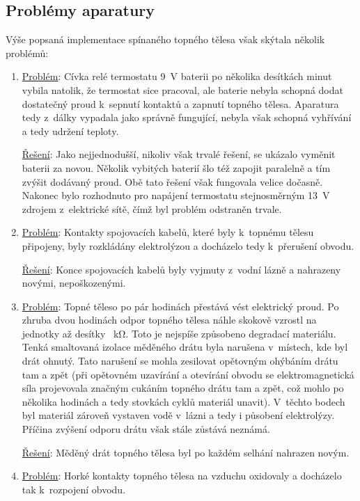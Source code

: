 \documentclass[12pt]{article}
\begin{document}
\subsection{Problémy aparatury}
Výše popsaná implementace spínaného topného tělesa však skýtala několik problémů:
\begin{enumerate}[noitemsep, topsep = 0pt]
    \item \underline{Problém}: Cívka relé termostatu \SI{9}{\volt} baterii po několika desítkách minut vybila natolik, že termostat sice pracoval, ale baterie nebyla schopná dodat dostatečný proud k~sepnutí kontaktů a zapnutí topného tělesa. Aparatura tedy z~dálky vypadala jako správně fungující, nebyla však schopná vyhřívání a tedy udržení teploty.
    \par \underline{Řešení}: Jako nejjednodušší, nikoliv však trvalé řešení, se ukázalo vyměnit baterii za novou. Několik vybitých baterií šlo též zapojit paralelně a tím zvýšit dodávaný proud. Obě tato řešení však fungovala velice dočasně. Nakonec bylo rozhodnuto pro napájení termostatu stejnosměrným \SI{13}{\volt} zdrojem z~elektrické sítě, čímž byl problém odstraněn trvale.
    \item \underline{Problém}: Kontakty spojovacích kabelů, které byly k~topnému tělesu připojeny, byly rozkládány elektrolýzou a docházelo tedy k~přerušení obvodu.
    \par \underline{Řešení}: Konce spojovacích kabelů byly vyjmuty z~vodní lázně a nahrazeny novými, nepoškozenými.
    \item \underline{Problém}: Topné těleso po pár hodinách přestává vést elektrický proud. Po zhruba dvou hodinách odpor topného tělesa náhle skokově vzrostl na jednotky až desítky \SI{}{\kilo\ohm}. Toto je nejspíše způsobeno degradací materiálu. Tenká smaltovaná izolace měděného drátu byla narušena v~místech, kde byl drát ohnutý. Tato narušení se mohla zesilovat opětovným ohýbáním drátu tam a zpět (při opětovném uzavírání a otevírání obvodu se elektromagnetická síla projevovala značným cukáním topného drátu tam a zpět, což mohlo po několika hodinách a tedy stovkách cyklů materiál unavit). V~těchto bodech byl materiál zároveň vystaven vodě v~lázni a tedy i působení elektrolýzy. Příčina zvýšení odporu drátu však stále zůstává neznámá.
    \par \underline{Řešení}: Měděný drát topného tělesa byl po každém selhání nahrazen novým.
    \item \underline{Problém}: Horké kontakty topného tělesa na vzduchu oxidovaly a docházelo tak k~rozpojení obvodu.

\end{enumerate}
\end{document}
